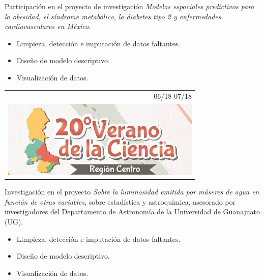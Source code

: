 \documentclass[]{friggeri-cv}
\begin{document}
\begin{entrylist}
{\begin{tabular}{r}
	\end{tabular}
    }
    {\vspace{-0.95cm}}
    { }
    {Participación en el proyecto de investigación \textsl{Modelos espaciales predictivos para la obesidad, el síndrome metabólico, la diabetes tipo 2 y enfermedades cardiovasculares en México}.
    \begin{itemize}
	\item Limpieza, detección e imputación de datos faltantes.
	\item Diseño de modelo descriptivo.
	\item Visualización de datos.
\end{itemize}}
  \entry
    {\begin{tabular}{r}
    		06/18-07/18\\
     		\includegraphics[scale=0.203]{img/20verano.jpeg}
	\end{tabular}\hspace{0.4cm}
    }
    {\vspace{-0.98cm}}
    { }
    {Investigación en el proyecto \textsl{Sobre la luminosidad emitida por máseres de agua en función de otras variables}, sobre estadística y astroquímica, asesorado por investigadores del Departamento de Astronomía de la Universidad de Guanajuato (UG).
    \begin{itemize}
	\item Limpieza, detección e imputación de datos faltantes.
	\item Diseño de modelo descriptivo.
	\item Visualización de datos.
\end{itemize}}%
\end{entrylist}
\vspace{-0.7cm}
\end{document}

